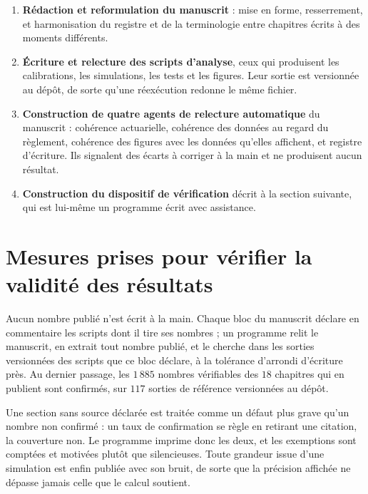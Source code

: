 \begin{enumerate}[itemsep=3pt]
\item \textbf{Rédaction et reformulation du manuscrit} : mise en forme, resserrement, et
      harmonisation du registre et de la terminologie entre chapitres écrits à des moments
      différents.

\item \textbf{Écriture et relecture des scripts d'analyse}, ceux qui produisent les calibrations,
      les simulations, les tests et les figures. Leur sortie est versionnée au dépôt, de sorte
      qu'une réexécution redonne le même fichier.

\item \textbf{Construction de quatre agents de relecture automatique} du manuscrit : cohérence
      actuarielle, cohérence des données au regard du règlement, cohérence des figures avec les
      données qu'elles affichent, et registre d'écriture. Ils signalent des écarts à corriger à la
      main et ne produisent aucun résultat.

\item \textbf{Construction du dispositif de vérification} décrit à la section suivante, qui est
      lui-même un programme écrit avec assistance.
\end{enumerate}

\section{Mesures prises pour vérifier la validité des résultats}

Aucun nombre publié n'est écrit à la main. Chaque bloc du manuscrit déclare en commentaire les
scripts dont il tire ses nombres ; un programme relit le manuscrit, en extrait tout nombre publié,
et le cherche dans les sorties versionnées des scripts que ce bloc déclare, à la tolérance
d'arrondi d'écriture près. Au dernier passage, les $1\,885$ nombres vérifiables des $18$ chapitres
qui en publient sont confirmés, sur $117$ sorties de référence versionnées au dépôt.

Une section sans source déclarée est traitée comme un défaut plus grave qu'un nombre non confirmé :
un taux de confirmation se règle en retirant une citation, la couverture non. Le programme imprime
donc les deux, et les exemptions sont comptées et motivées plutôt que silencieuses. Toute grandeur
issue d'une simulation est enfin publiée avec son bruit, de sorte que la précision affichée ne
dépasse jamais celle que le calcul soutient.

